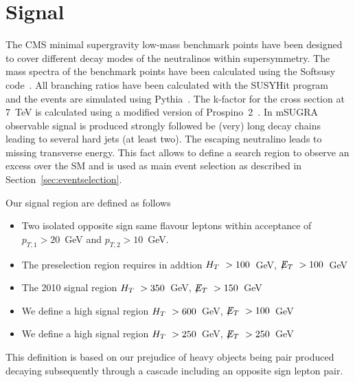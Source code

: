 \section{Signal}\label{sec:signal}

The CMS minimal supergravity low-mass benchmark points
have been designed to cover 
different decay modes of the neutralinos within supersymmetry. 
The mass spectra of the benchmark points have been calculated using the Softsusy code~\cite{softsusy}. 
All branching ratios have been calculated with the SUSYHit program~\cite{susyhit} 
and the events are simulated using Pythia~\cite{pythia}. 
The k-factor for the cross section at 7~TeV is calculated using a modified version of Prospino~2~\cite{prospino}. 
In mSUGRA observable signal is produced strongly followed be (very) long decay chains 
leading to several hard jets (at least two). 
The escaping neutralino leads to missing transverse energy. 
This fact allows to define a search region to observe an excess over the SM 
and is used as main event selection as described in Section~\ref{sec:eventselection}.

Our signal region are defined as follows
\begin{itemize}
\item Two isolated opposite sign same flavour leptons within acceptance of $p_{T,1}>20$~GeV and $p_{T,2}>10$~GeV.
\item The preselection region requires in addtion $H_T~ > 100$~GeV, $\displaystyle{\not} E_T~>100$~GeV
\item The 2010 signal region $H_T~ > 350$~GeV, $\displaystyle{\not} E_T~>150$~GeV
\item We define a high \HT signal region $H_T~ > 600$~GeV, $\displaystyle{\not} E_T~>100$~GeV
\item We define a high \MET signal region $H_T~ > 250$~GeV, $\displaystyle{\not} E_T~>250$~GeV
\end{itemize}

This definition is based on our prejudice of heavy objects
being pair produced decaying subsequently through a cascade
including an opposite sign lepton pair.



